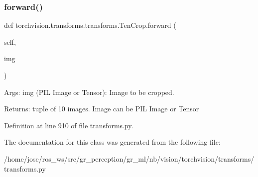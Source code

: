 \subsubsection{\texorpdfstring{forward()}{forward()}}
{\footnotesize\ttfamily def torchvision.\+transforms.\+transforms.\+Ten\+Crop.\+forward (\begin{DoxyParamCaption}\item[{}]{self,  }\item[{}]{img }\end{DoxyParamCaption})}

\begin{DoxyVerb}Args:
    img (PIL Image or Tensor): Image to be cropped.

Returns:
    tuple of 10 images. Image can be PIL Image or Tensor
\end{DoxyVerb}
 

Definition at line 910 of file transforms.\+py.



The documentation for this class was generated from the following file\+:\begin{DoxyCompactItemize}
\item 
/home/jose/ros\+\_\+ws/src/gr\+\_\+perception/gr\+\_\+ml/nb/vision/torchvision/transforms/transforms.\+py\end{DoxyCompactItemize}
